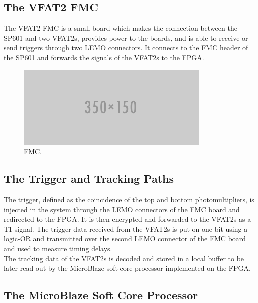     \subsection{The VFAT2 FMC}

      The VFAT2 FMC is a small board which makes the connection between the SP601 and two VFAT2s, provides power to the boards, and is able to receive or send triggers through two LEMO connectors. It connects to the FMC header of the SP601 and forwards the signals of the VFAT2s to the FPGA.

      \begin{figure}[h!]
        \centering
        \includegraphics[width=\textwidth]{img/empty.png}
        \caption{FMC.}
        \label{fig:III-1-fmc}
      \end{figure}

    \subsection{The Trigger and Tracking Paths}

      The trigger, defined as the coincidence of the top and bottom photomultipliers, is injected in the system through the LEMO connectors of the FMC board and redirected to the FPGA. It is then encrypted and forwarded to the VFAT2s as a T1 signal. The trigger data received from the VFAT2s is put on one bit using a logic-OR and transmitted over the second LEMO connector of the FMC board and used to measure timing delays. \\

      The tracking data of the VFAT2s is decoded and stored in a local buffer to be later read out by the MicroBlaze soft core processor implemented on the FPGA.

    \subsection{The MicroBlaze Soft Core Processor}


